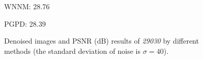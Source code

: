 \begin{figure}[ht!]
{\begin{minipage}[t]{0.24\textwidth}
{\footnotesize WNNM: 28.76}
\end{minipage}
\begin{minipage}[t]{0.24\textwidth}
\centering
{}
{\footnotesize PGPD: 28.39}
\end{minipage}
}\vspace{-3mm}
\caption{Denoised images and PSNR (dB) results of \textsl{29030} by different methods (the standard deviation of noise is $\sigma=40$).}
    \label{fig2-15}
\end{figure}

